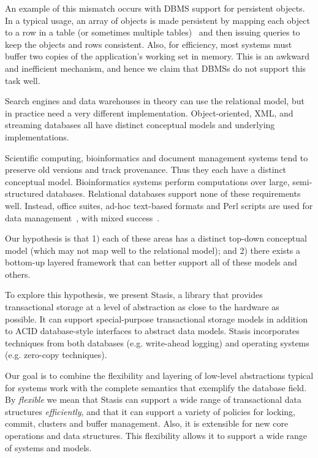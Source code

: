 \documentclass[letterpaper,twocolumn,10pt]{article}
\newcommand{\yad}{Stasis\xspace}
\begin{document}
An example of this mismatch occurs with DBMS support for persistent objects.
In a typical usage, an array of objects is made persistent by mapping
each object to a row in a table (or sometimes multiple
tables)~\cite{hibernate} and then issuing queries to keep the objects
and rows consistent. 
Also, for efficiency, most systems
must buffer two copies of the application's working set in memory.
This is an awkward and inefficient mechanism, and hence we claim that
DBMSs do not support this task well.

Search engines and data warehouses in theory can use the relational
model, but in practice need a very different implementation.
Object-oriented, XML, and streaming databases all have distinct
conceptual models and underlying implementations.

Scientific computing, bioinformatics and document management systems tend
to preserve old versions and track provenance.  Thus they each have a
distinct conceptual model.  Bioinformatics systems perform
computations over large, semi-structured databases.  Relational
databases support none of these requirements well. Instead, office
suites, ad-hoc text-based formats and Perl scripts are used for data
management~\cite{perl}, with mixed success~\cite{excel}.

Our hypothesis is that 1) each of these areas has a distinct top-down
conceptual model (which may not map well to the relational model); and
2) there exists a bottom-up layered framework that can better support
all of these models and others.

To explore this hypothesis, we present \yad, a library that provides
transactional storage at a level of abstraction as close to the
hardware as possible.  It can support special-purpose
transactional storage models in addition to ACID database-style
interfaces to abstract data models.  \yad incorporates techniques from both
databases (e.g. write-ahead logging) and operating systems
(e.g. zero-copy techniques).

Our goal is to combine the flexibility and layering of low-level
abstractions typical for systems work with the complete semantics
that exemplify the database field.
By {\em flexible} we mean that \yad{}  can support a wide
range of transactional data structures {\em efficiently}, and that it can support a variety
of policies for locking, commit, clusters and buffer management.
Also, it is extensible for new core operations
and data structures. This flexibility allows it to
support a wide range of systems and models.
\end{document}
